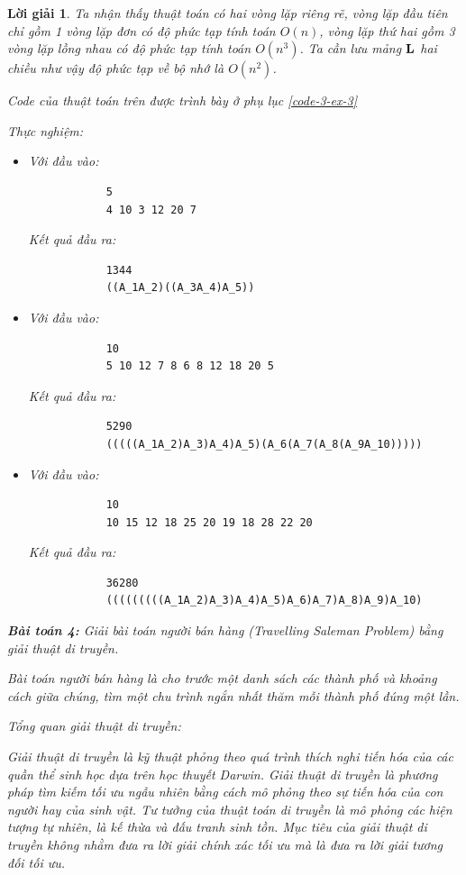 \documentclass[14pt, a4paper]{article}
\theoremstyle{sltheorem}
\theoremstyle{soltheorem}
\newtheorem*{loigiai}{Lời giải}
\begin{document}
\begin{loigiai}
    Ta nhận thấy thuật toán có hai vòng lặp riêng rẽ, vòng lặp đầu tiên chỉ gồm 1 vòng lặp đơn có độ phức tạp tính toán $O(n)$,
    vòng lặp thứ hai gồm 3 vòng lặp lồng nhau có độ phức tạp tính toán $O(n^3)$. Ta cần lưu mảng $\bold{L}$ hai chiều như vậy độ phức tạp về bộ nhớ là $O(n^2)$.

    Code của thuật toán trên được trình bày ở phụ lục \ref{code-3-ex-3}

    Thực nghiệm:

    \begin{itemize}
        \item Với đầu vào:
        \begin{verbatim}
            5
            4 10 3 12 20 7
        \end{verbatim}
        Kết quả đầu ra:
        \begin{verbatim}
            1344
            ((A_1A_2)((A_3A_4)A_5))
        \end{verbatim}
        \item Với đầu vào:
        \begin{verbatim}
            10
            5 10 12 7 8 6 8 12 18 20 5
        \end{verbatim}
        Kết quả đầu ra:
        \begin{verbatim}
            5290
            (((((A_1A_2)A_3)A_4)A_5)(A_6(A_7(A_8(A_9A_10)))))
        \end{verbatim}
        \item Với đầu vào:
        \begin{verbatim}
            10
            10 15 12 18 25 20 19 18 28 22 20
        \end{verbatim}
        Kết quả đầu ra:
        \begin{verbatim}
            36280
            (((((((((A_1A_2)A_3)A_4)A_5)A_6)A_7)A_8)A_9)A_10)
        \end{verbatim}
    \end{itemize}

    \textbf{Bài toán 4:} Giải bài toán người bán hàng (Travelling Saleman Problem) bằng giải thuật di truyền.

    Bài toán người bán hàng là cho trước một danh sách các thành phố và khoảng cách giữa chúng,
    tìm một chu trình ngắn nhất thăm mỗi thành phố đúng một lần.

    Tổng quan giải thuật di truyền:

    Giải thuật di truyền là kỹ thuật phỏng theo quá trình thích nghi tiến hóa của các quần thể sinh học dựa trên học thuyết Darwin. 
    Giải thuật di truyền là phương pháp tìm kiếm tối ưu ngẫu nhiên bằng cách mô phỏng theo sự tiến hóa của con người hay của sinh vật. 
    Tư tưởng của thuật toán di truyền là mô phỏng các hiện tượng tự nhiên, là kế thừa và đấu tranh sinh tồn.
    Mục tiêu của giải thuật di truyền không nhằm đưa ra lời giải chính xác tối ưu mà là đưa ra lời giải tương đối tối ưu.


\end{loigiai}
\end{document}
